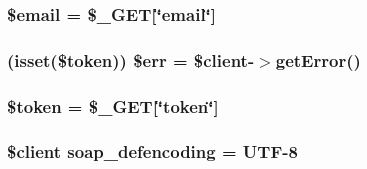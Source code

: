 \subsubsection[{\$email}]{\setlength{\rightskip}{0pt plus 5cm}\$email = \$\+\_\+\+G\+E\+T\mbox{[}\char`\"{}email\char`\"{}\mbox{]}}\label{_list_all_cars_8php_ad634f418b20382e2802f80532d76d3cd}
\hypertarget{_list_all_cars_8php_a83cc27ac51f837246f548088b8d7a674}{}
\subsubsection[{\$err}]{ (isset(\$token)) \$err = \$client-\/$>$get\+Error()}\label{_list_all_cars_8php_a83cc27ac51f837246f548088b8d7a674}
\hypertarget{_list_all_cars_8php_a00ae4fcafb1145f5e968bdf920f83e2e}{}
\subsubsection[{\$token}]{\setlength{\rightskip}{0pt plus 5cm}\$token = \$\+\_\+\+G\+E\+T\mbox{[}\char`\"{}token\char`\"{}\mbox{]}}\label{_list_all_cars_8php_a00ae4fcafb1145f5e968bdf920f83e2e}
\hypertarget{_list_all_cars_8php_a944cce1b9c1aa5e93c77ace20ce99989}{}
\subsubsection[{soap\+\_\+defencoding}]{\setlength{\rightskip}{0pt plus 5cm}\$client soap\+\_\+defencoding = \textquotesingle{}U\+T\+F-\/8\textquotesingle{}}\label{_list_all_cars_8php_a944cce1b9c1aa5e93c77ace20ce99989}
